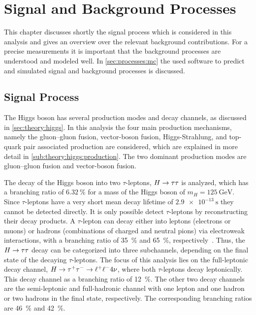 \chapter{Signal and Background Processes}\label{cha:processes}

This chapter discusses shortly the signal process which is considered in this analysis and gives an overview
over the relevant background contributions.
For a precise measurements it is important that the background processes are understood and modeled well.
In \cref{sec:processes:mc} the used software to predict and simulated signal and background processes is discussed.

\section{Signal Process}\label{sec:processes:signal}

The Higgs boson has several production modes and decay channels, as discussed in \cref{sec:theory:higgs}.
In this analysis the four main production mechanisms, namely the gluon--gluon fusion, vector-boson fusion, Higgs-Strahlung, and
top-quark pair associated production are considered, which are explained in more detail in \cref{sub:theory:higgs:production}.
The two dominant production modes are gluon--gluon fusion and vector-boson fusion.

The decay of the Higgs boson into two $\tau$-leptons, $H \to \tau \tau$ is analyzed, which has a branching ratio of
$\SI{6.32}{\percent}$ for a mass of the Higgs boson of $m_H = \SI{125}{\GeV}$.
Since $\tau$-leptons have a very short mean decay lifetime of $\SI{2.9e-13}{\s}$ they cannot be detected
directly.
It is only possible detect $\tau$-leptons by reconstructing their decay products.
A $\tau$-lepton can decay either into leptons (electrons or muons) or hadrons (combinations of charged and neutral pions)
via electroweak interactions, with a branching ratio of \SI{35}{\percent} and \SI{65}{\percent}, respectively~\cite{PDG}.
Thus, the $H \to \tau \tau$ decay can be categorized into three subchannels, depending on the final state of the decaying $\tau$-leptons.
The focus of this analysis lies on the full-leptonic decay channel, $H \to \tau^+\tau^- \to \ell^+\ell^- 4\nu$, where both $\tau$-leptons decay leptonically.
This decay channel as a branching ratio of \SI{12}{\percent}.
The other two decay channels are the semi-leptonic and full-hadronic channel with one lepton and one hadron or two hadrons
in the final state, respectively.
The corresponding branching ratios are \SI{46}{\percent} and \SI{42}{\percent}.

